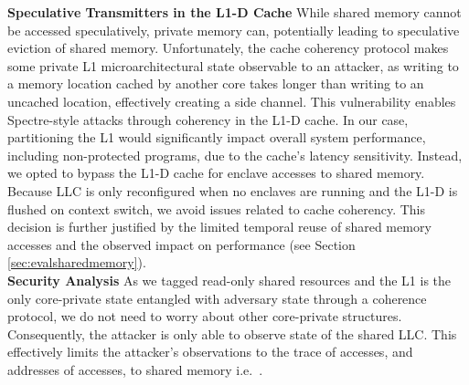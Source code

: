 \noindent\textbf{Speculative Transmitters in the L1-D Cache}
\label{sec:l1bypass}
While shared memory cannot be accessed speculatively, private memory can, potentially leading to speculative eviction of shared memory.
Unfortunately, the cache coherency protocol makes some private L1 microarchitectural state observable to an attacker, as writing to a memory location cached by another core takes longer than writing to an uncached location, effectively creating a side channel.
This vulnerability enables Spectre-style attacks through coherency in the L1-D cache.
In our case, partitioning the L1 would significantly impact overall system performance, including non-protected programs, due to the cache's latency sensitivity.
Instead, we opted to bypass the L1-D cache for enclave accesses to shared memory.
Because LLC is only reconfigured when no enclaves are running and the L1-D is flushed on context switch, we avoid issues related to cache coherency.
This decision is further justified by the limited temporal reuse of shared memory accesses and the observed impact on performance (see Section \ref{sec:evalsharedmemory}).
\\

\noindent\textbf{Security Analysis}
As we tagged read-only shared resources and the L1 is the only core-private state entangled with adversary state through a coherence protocol, we do not need to worry about other core-private structures.
Consequently, the attacker is only able to observe state of the shared LLC.
This effectively limits the attacker's observations to the trace of accesses, and addresses of accesses, to shared memory i.e.~.